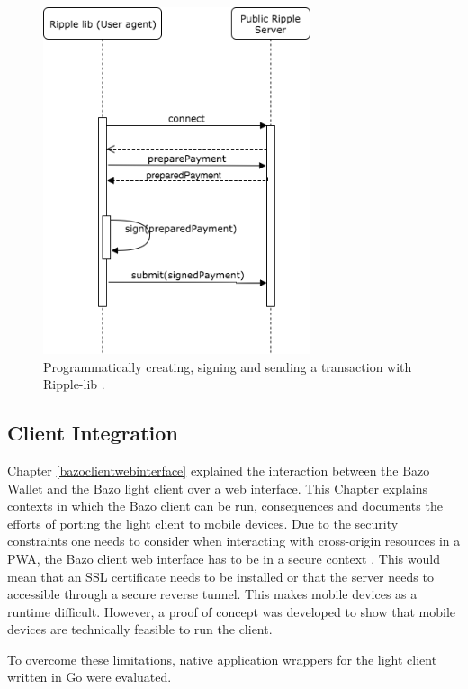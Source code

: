 \begin{figure}
\centering
\includegraphics[width=0.7\textwidth]{diagrams/ripplelibSendTX.png}
\caption{\label{fig:ripplesendTx}Programmatically creating, signing and sending a transaction with Ripple-lib \cite{ripplelib}.}
\end{figure}


\subsection{Client Integration}\label{bazomobile}

Chapter \ref{bazoclientwebinterface} explained the interaction between the Bazo Wallet and the Bazo light client over a web interface.
This Chapter explains contexts in which the Bazo client can be run, consequences and documents the efforts of porting the light client to mobile devices.
Due to the security constraints one needs to consider when interacting with cross-origin resources in a PWA, the Bazo client web interface has to be in a secure context \cite{securitychrome}. This would mean that an SSL certificate needs to be installed or that the server needs to accessible through a secure reverse tunnel.
This makes mobile devices as a runtime difficult. However, a proof of concept was developed to show that mobile devices are technically feasible to run the client. 

To overcome these limitations, native application wrappers for the light client written in Go were evaluated. 

